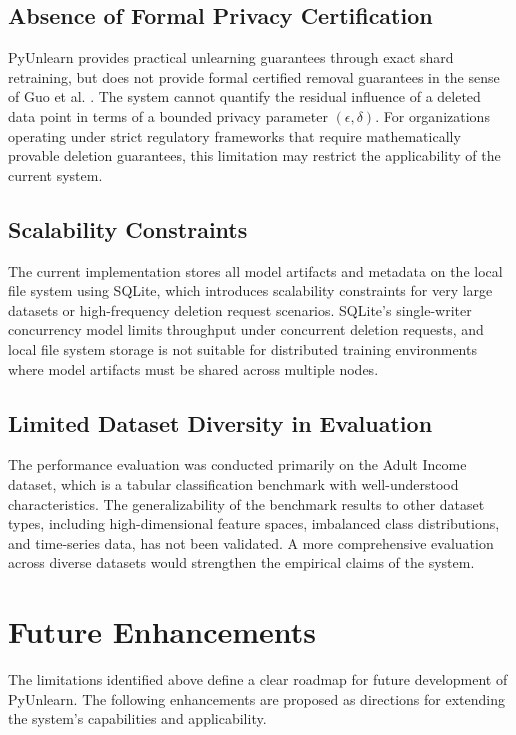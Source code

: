 \subsection{Absence of Formal Privacy Certification}
PyUnlearn provides practical unlearning guarantees through exact shard retraining, but does not provide formal certified removal guarantees in the sense of Guo et al. \cite{guo2020certified}. The system cannot quantify the residual influence of a deleted data point in terms of a bounded privacy parameter $(\epsilon, \delta)$. For organizations operating under strict regulatory frameworks that require mathematically provable deletion guarantees, this limitation may restrict the applicability of the current system.

\subsection{Scalability Constraints}
The current implementation stores all model artifacts and metadata on the local file system using SQLite, which introduces scalability constraints for very large datasets or high-frequency deletion request scenarios. SQLite's single-writer concurrency model limits throughput under concurrent deletion requests, and local file system storage is not suitable for distributed training environments where model artifacts must be shared across multiple nodes.

\subsection{Limited Dataset Diversity in Evaluation}
The performance evaluation was conducted primarily on the Adult Income dataset, which is a tabular classification benchmark with well-understood characteristics. The generalizability of the benchmark results to other dataset types, including high-dimensional feature spaces, imbalanced class distributions, and time-series data, has not been validated. A more comprehensive evaluation across diverse datasets would strengthen the empirical claims of the system.

\section{Future Enhancements}

The limitations identified above define a clear roadmap for future development of PyUnlearn. The following enhancements are proposed as directions for extending the system's capabilities and applicability.

